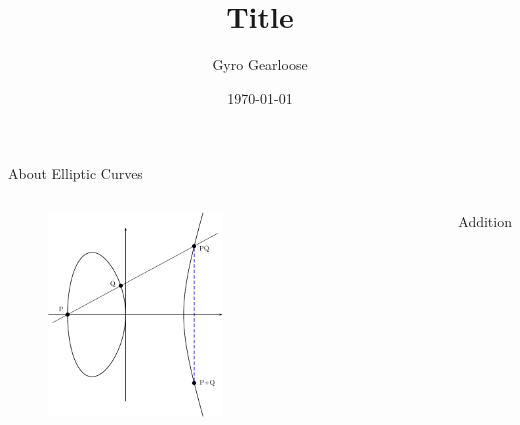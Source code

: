 \documentclass[aspectratio=169]{beamer}
\title              {Title}
\author             {Gyro Gearloose}
\institute          {Institut f\"ur Geomatik}
\date               {\today}
\begin{document}
\begin{frame}[t,plain]
\titlepage
\end{frame}


\begin{frame}[c]{About Elliptic Curves}
\begin{columns}[c]
	 \begin{figure}
    	\includegraphics[width=0.5\textwidth]{Figures/ellcurveadd}
	 \end{figure}
	 	Addition
\end{columns}
\end{frame}
\end{document}

